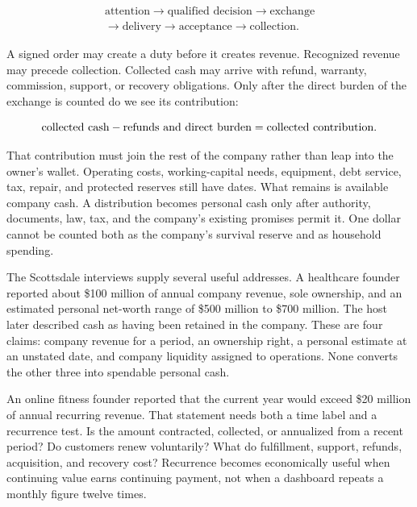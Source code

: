 \begin{equation}
\begin{gathered}
\text{attention}\rightarrow\text{qualified decision}\rightarrow\text{exchange}\\
\rightarrow\text{delivery}\rightarrow\text{acceptance}\rightarrow\text{collection}.
\end{gathered}
\end{equation}

A signed order may create a duty before it creates revenue. Recognized revenue
may precede collection. Collected cash may arrive with refund, warranty,
commission, support, or recovery obligations. Only after the direct burden of
the exchange is counted do we see its contribution:

\begin{equation}
\ifdim\paperwidth<450pt
\begin{gathered}
\text{collected contribution}\\
=\text{collected cash}-\text{refunds}\\
\phantom{=}-\text{direct burden}.
\end{gathered}
\else
\text{collected cash}-\text{refunds and direct burden}
=\text{collected contribution}.
\fi
\end{equation}

That contribution must join the rest of the company rather than leap into the
owner's wallet. Operating costs, working-capital needs, equipment, debt service,
tax, repair, and protected reserves still have dates. What remains is available
company cash. A distribution becomes personal cash only after authority,
documents, law, tax, and the company's existing promises permit it. One dollar
cannot be counted both as the company's survival reserve and as household
spending.

The Scottsdale interviews supply several useful addresses. A healthcare founder
reported about \$100 million of annual company revenue, sole ownership, and an
estimated personal net-worth range of \$500 million to \$700 million. The host
later described cash as having been retained in the company. These are four
claims: company revenue for a period, an ownership right, a personal estimate at
an unstated date, and company liquidity assigned to operations. None converts
the other three into spendable personal cash.

An online fitness founder reported that the current year would exceed \$20
million of annual recurring revenue. That statement needs both a time label and
a recurrence test. Is the amount contracted, collected, or annualized from a
recent period? Do customers renew voluntarily? What do fulfillment, support,
refunds, acquisition, and recovery cost? Recurrence becomes economically useful
when continuing value earns continuing payment, not when a dashboard repeats a
monthly figure twelve times.

